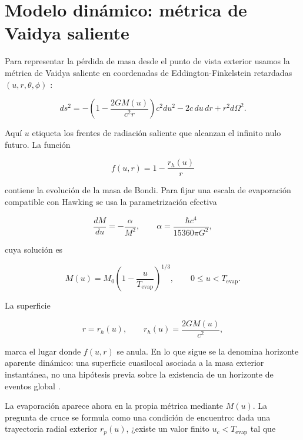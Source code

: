 \documentclass[
aps,
prd,
reprint,
superscriptaddress,
nofootinbib,
amsmath,
amssymb
]{revtex4-2}
\begin{document}
\section{Modelo dinámico: métrica de Vaidya saliente}

Para representar la pérdida de masa desde el punto de vista exterior usamos la métrica de Vaidya saliente en coordenadas de Eddington-Finkelstein retardadas $(u,r,\theta,\phi)$ \cite{Vaidya1951,Poisson2004}:

\begin{equation}
ds^2 =
-
\left(
1-\frac{2GM(u)}{c^2r}
\right)c^2du^2
-2c\,du\,dr
+r^2d\Omega^2.
\label{eqVaidyaMetric}
\end{equation}

Aquí $u$ etiqueta los frentes de radiación saliente que alcanzan el infinito nulo futuro. La función

\begin{equation}
f(u,r)=
1-\frac{r_h(u)}{r}
\end{equation}

contiene la evolución de la masa de Bondi. Para fijar una escala de evaporación compatible con Hawking se usa la parametrización efectiva

\begin{equation}
\frac{dM}{du}
=
-
\frac{\alpha}{M^2},
\qquad
\alpha =
\frac{\hbar c^4}{15360\pi G^2},
\label{eqMassLoss}
\end{equation}

cuya solución es

\begin{equation}
M(u)=
M_0
\left(
1-\frac{u}{T_{\mathrm{evap}}}
\right)^{1/3},
\qquad
0\leq u<T_{\mathrm{evap}}.
\label{eqMassLaw}
\end{equation}

La superficie

\begin{equation}
r=r_h(u),
\qquad
r_h(u)=
\frac{2GM(u)}{c^2},
\label{eqEffectiveHorizon}
\end{equation}

marca el lugar donde $f(u,r)$ se anula. En lo que sigue se la denomina horizonte aparente dinámico: una superficie cuasilocal asociada a la masa exterior instantánea, no una hipótesis previa sobre la existencia de un horizonte de eventos global \cite{Hayward1994,AshtekarKrishnan2004,Visser2014,Nielsen2008}.

La evaporación aparece ahora en la propia métrica mediante $M(u)$. La pregunta de cruce se formula como una condición de encuentro: dada una trayectoria radial exterior $r_p(u)$, ¿existe un valor finito $u_c<T_{\mathrm{evap}}$ tal que
\end{document}
